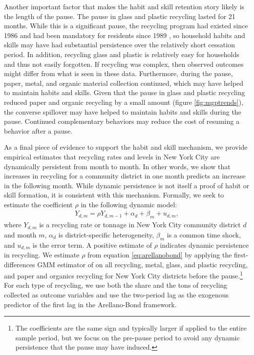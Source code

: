 \documentclass[12pt]{article}
\begin{document}
Another important factor that makes the habit and skill retention story likely is the length of the pause. 
 The pause in glass and plastic recycling lasted for 21 months.  While this is a significant pause, the recycling program had existed since 1986 and had been mandatory for residents since 1989 \citep{lubasch1989,macbride2004}, so household habits and skills may have had substantial persistence over the relatively short cessation period.  In addition, recycling glass and plastic is relatively easy for households and thus not easily forgotten.  If recycling was complex, then observed outcomes might differ from what is seen in these data.  Furthermore, during the pause, paper, metal, and organic material collection continued, which may have helped to maintain habits and skills.  Given that the pause in glass and plastic recycling reduced paper and organic recycling by a small amount (figure \ref{fig:mgptrends}), the converse spillover may have helped to maintain habits and skills during the pause.  Continued complementary behaviors may reduce the cost of resuming a behavior after a pause.

As a final piece of evidence to support the habit and skill mechanism, we provide empirical estimates that recycling rates and levels in New York City are dynamically persistent from month to month.  In other words, we show that increases in recycling for a community district in one month predicts an increase in the following month.  While dynamic persistence is not itself a proof of habit or skill formation, it is consistent with this mechanism.  Formally, we seek to estimate the coefficient \(\rho\) in the following dynamic model:
\begin{align} \label{eq:arellanobond}
    Y_{d,m} = \rho Y_{d,m-1} + \alpha_d + \beta_m + u_{d,m},
\end{align}
where \(Y_{d,m}\) is a recycling rate or tonnage in New York City community district \(d\) and month \(m\), \(\alpha_d\) is district-specific heterogeneity, \(\beta_m\) is a common time shock, and \(u_{d,m}\) is the error term.  A positive estimate of \(\rho\) indicates dynamic persistence in recycling.  We estimate \(\rho\) from equation \ref{eq:arellanobond} by applying the first-differences GMM estimator of \cite{arellanobond1991} on all recycling, metal, glass, and plastic recycling, and paper and organics recycling for New York City districts before the pause.\footnote{The coefficients are the same sign and typically larger if applied to the entire sample period, but we focus on the pre-pause period to avoid any dynamic persistence that the pause may have induced.}  For each type of recycling, we use both the share and the tons of recycling collected as outcome variables and use the two-period lag as the exogenous predictor of the first lag in the Arellano-Bond framework.
\end{document}
